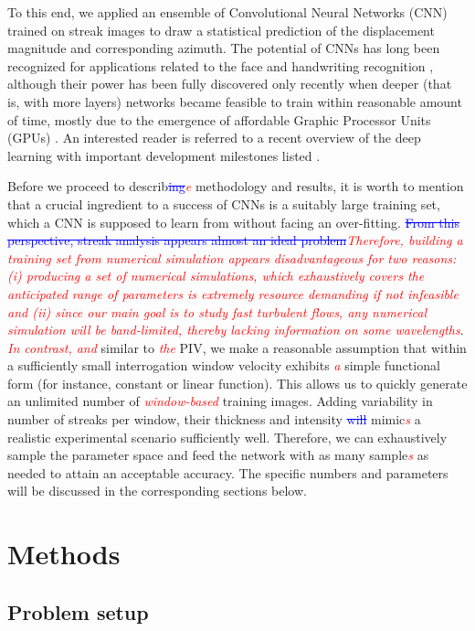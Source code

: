 \documentclass{svjour3}                     %
\newcommand{\new}[1]{\textit{\textcolor{red}{#1}}}
\newcommand{\old}[1]{\textcolor{blue}{\sout{#1}}}
\begin{document}
To this end, we applied an ensemble of Convolutional Neural Networks (CNN) trained on streak images to draw a statistical prediction of the displacement magnitude and corresponding azimuth. The potential of CNNs has long been recognized for applications related to the face and handwriting recognition \cite{lawrence1997face, simard2003best}, although their power has been fully discovered only recently when deeper (that is, with more layers) networks became feasible to train within reasonable amount of time, mostly due to the emergence of affordable Graphic Processor Units (GPUs) \cite{krizhevsky2012imagenet, karpathy2014large}. An interested reader is referred to a recent overview of the deep learning with important development milestones listed \cite{lecun2015deep}.

Before we proceed to describ\old{ing}\new{e} methodology and results, it is worth to mention that a crucial ingredient to a success of CNNs is a suitably large training set, which a CNN is supposed to learn from without facing an over-fitting. \old{From this perspective, streak analysis appears almost an ideal problem}\new{Therefore, building a training set from numerical simulation appears disadvantageous for two reasons: (i) producing a set of numerical simulations, which exhaustively covers the anticipated range of parameters is extremely resource demanding if not infeasible and (ii) since our main goal is to study fast turbulent flows, any numerical simulation will be band-limited, thereby lacking information on some wavelengths}. \new{In contrast, and} similar to \new{the} PIV, we make a reasonable assumption that within a sufficiently small interrogation window velocity exhibits \new{a} simple functional form (for instance, constant or linear function). This allows us to quickly generate an unlimited number of \new{window-based} training images. Adding variability in number of streaks per window, their thickness and intensity \old{will} mimic\new{s} a realistic experimental scenario sufficiently well. Therefore, we can exhaustively sample the parameter space and feed the network with as many sample\new{s} as needed to attain an acceptable accuracy. The specific numbers and parameters will be discussed in the corresponding sections below.

\section{Methods}
\label{sec:methodology}

\subsection{Problem setup}
\end{document}
